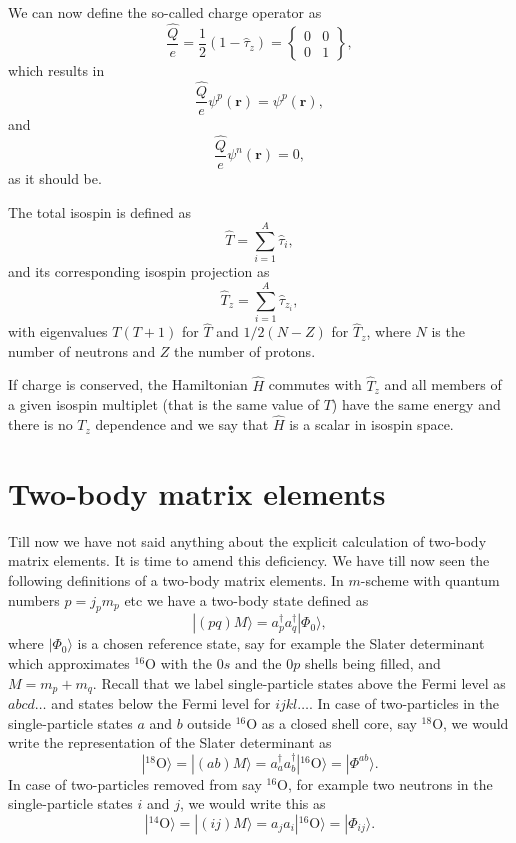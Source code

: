\documentclass[graybox,sectrefs,envcountresetchap,open=right]{svmonodo}
\begin{document}
We can now define the so-called charge operator as 
\[
\frac{\hat{Q}}{e} = \frac{1}{2}\left(1-\hat{\tau}_z\right)=\begin{Bmatrix} 0 & 0 \\ 0 & 1 \end{Bmatrix},
\]
which results in 
\[
\frac{\hat{Q}}{e}\psi^p(\mathbf{r})=\psi^p(\mathbf{r}),
\]
and
\[
\frac{\hat{Q}}{e}\psi^n(\mathbf{r})=0,
\]
as it should be. 

The total isospin is defined as
\[
\hat{T}=\sum_{i=1}^A\hat{\tau}_i,
\]
and its corresponding isospin projection as
\[
\hat{T}_z=\sum_{i=1}^A\hat{\tau}_{z_i},
\]
with eigenvalues $T(T+1)$ for $\hat{T}$ and $1/2(N-Z)$ for $\hat{T}_z$, where $N$ is the number of neutrons and $Z$ the number of protons. 

If charge is conserved, the Hamiltonian $\hat{H}$ commutes with $\hat{T}_z$ and all members of a given isospin multiplet
(that is the same value of $T$) have the same energy and there is no $T_z$ dependence and we say that $\hat{H}$ is a scalar in isospin space.




\section{Two-body matrix elements}

Till now we have not said anything about the explicit calculation of two-body matrix elements. It is time to amend this deficiency.
We have till now seen the following definitions of a two-body matrix elements. In $m$-scheme
with quantum numbers $p=j_pm_p$ etc we have a two-body state defined as
\[
|(pq)M\rangle  = a^{\dagger}_pa^{\dagger}_q|\Phi_0\rangle,
\]
where $|\Phi_0\rangle$ is a chosen reference state, say for example the Slater determinant which approximates ${}^{16}\mbox{O}$ with the $0s$ and the $0p$ shells being filled, and $M=m_p+m_q$. Recall that we label single-particle states above the Fermi level as $abcd\dots$ and states below the Fermi level for $ijkl\dots$.  
In case of two-particles in the single-particle states $a$ and $b$ outside ${}^{16}\mbox{O}$ as a closed shell core, say ${}^{18}\mbox{O}$, 
we would write the representation of the Slater determinant as
\[
|^{18}\mathrm{O}\rangle =|(ab)M\rangle  = a^{\dagger}_aa^{\dagger}_b|^{16}\mathrm{O}\rangle=|\Phi^{ab}\rangle.
\]
In case of two-particles removed from say ${}^{16}\mbox{O}$, for example two neutrons in the single-particle states $i$ and $j$, we would write this as
\[
|^{14}\mathrm{O}\rangle =|(ij)M\rangle  = a_ja_i|^{16}\mathrm{O}\rangle=|\Phi_{ij}\rangle.
\]
\end{document}
